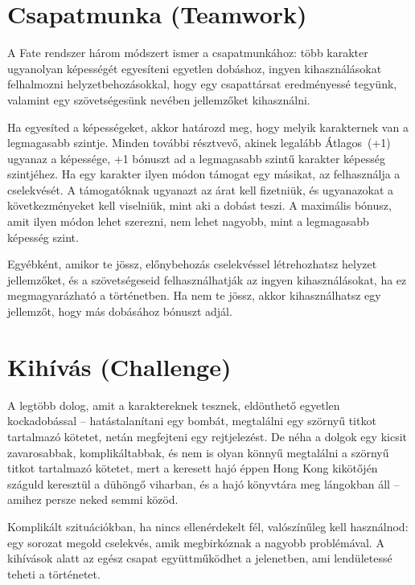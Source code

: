 \label{Csapatmunka}
\section[Csapatmunka]{Csapatmunka (Teamwork)}

A Fate rendszer három módszert ismer a csapatmunkához: több karakter ugyanolyan képességét egyesíteni egyetlen dobáshoz, ingyen kihasználásokat felhalmozni helyzetbehozásokkal, hogy egy csapattársat eredményessé tegyünk, valamint egy szövetségesünk nevében jellemzőket kihasználni.

Ha egyesíted a képességeket, akkor határozd meg, hogy melyik karakternek van a legmagasabb szintje. Minden további résztvevő, akinek legalább Átlagos~(+1) ugyanaz a képessége, +1 bónuszt ad a legmagasabb szintű karakter képesség szintjéhez. Ha egy karakter ilyen módon támogat egy másikat, az felhasználja a cselekvését. A támogatóknak ugyanazt az árat kell fizetniük, és ugyanazokat a következményeket kell viselniük, mint aki a dobást teszi. A maximális bónusz, amit ilyen módon lehet szerezni, nem lehet nagyobb, mint a legmagasabb képesség szint.

Egyébként, amikor te jössz, előnybehozás cselekvéssel létrehozhatsz helyzet jellemzőket, és a szövetségeseid felhasználhatják az ingyen kihasználásokat, ha ez megmagyarázható a történetben. Ha nem te jössz, akkor kihasználhatsz egy jellemzőt, hogy más dobásához bónuszt adjál.

\label{Kihívás}
\section[Kihívás]{Kihívás (Challenge)}

A legtöbb dolog, amit a karaktereknek tesznek, eldönthető egyetlen kockadobással -- hatástalanítani egy bombát, megtalálni egy szörnyű titkot tartalmazó kötetet, netán megfejteni egy rejtjelezést. De néha a dolgok egy kicsit zavarosabbak, komplikáltabbak, és nem is olyan könnyű megtalálni a szörnyű titkot tartalmazó kötetet, mert a keresett hajó éppen Hong Kong kikötőjén száguld keresztül a dühöngő viharban, és a hajó könyvtára meg lángokban áll -- amihez persze neked semmi közöd.

Komplikált szituációkban, ha nincs ellenérdekelt fél, valószínűleg  kell használnod: egy sorozat megold cselekvés, amik megbirkóznak a nagyobb problémával. A kihívások alatt az egész csapat együttműködhet a jelenetben, ami lendületessé teheti a történetet.

